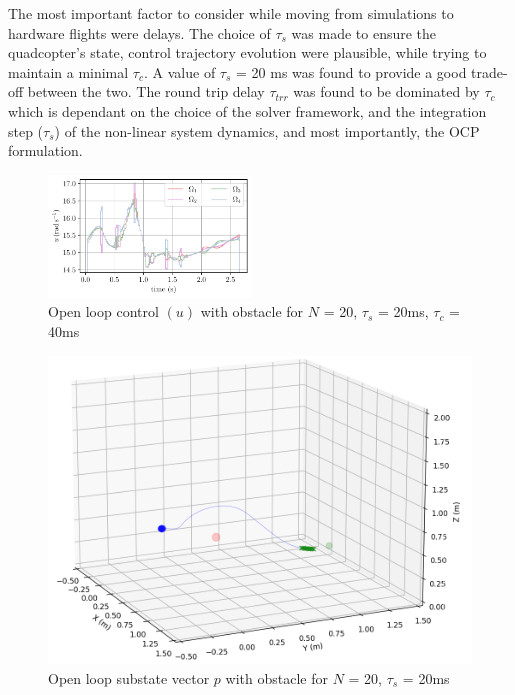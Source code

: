 \documentclass[conference]{IEEEtran}
\begin{document}
The most important factor to consider while moving from simulations to hardware flights were delays. The choice of
$\tau_s$ was made to ensure the quadcopter's state, control trajectory evolution were plausible, while trying to maintain a minimal $\tau_c$. A value of $\tau_s$ = 20 ms was found to provide a good trade-off between the two.
The round trip delay $\tau_{trr}$ was found to be dominated by $\tau_{c}$ which is dependant on the choice of the solver framework, and the integration step ($\tau_s$) of the non-linear system dynamics, and most importantly, the OCP formulation.


\begin{figure}[t!]
    \includegraphics[width=0.48\textwidth]{figures/u.pdf}
    \caption{Open loop control $(u)$ with obstacle for $N$ = 20, $\tau_s$ = 20ms, $\tau_c$ = 40ms}  \label{fig_comp_zeta_u_AGV}
\end{figure}

\begin{figure}[htbp]
	\centerline{\includegraphics[scale = 0.4]{figures/Screenshot_OLwO_ST.png} }
	\caption{Open loop substate vector $p$ with obstacle for $N$ = 20, $\tau_s$ = 20ms}
	\label{Fig4}
\end{figure}
\end{document}
